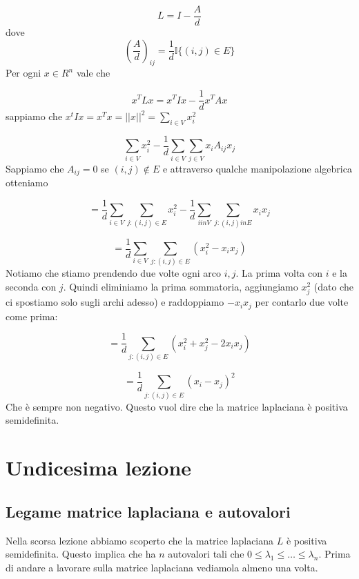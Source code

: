 \documentclass[12pt]{report}
\begin{document}
$$L= I - \frac{A}{d}$$
dove
$$(\frac{A}{d})_{ij} = \frac{1}{d} \mathds{I} \{(i,j) \in E\}$$
Per ogni $x \in R^n$ vale che

$$x^T L x = x^T I x - \frac{1}{d} x^T A x$$
sappiamo che $x^t I x = x^T x = ||x||^2 = \sum_{i \in V} x_i^2$

$$\sum_{i \in V} x_i^2 - \frac{1}{d} \sum_{i \in V}\sum_{j \in V} x_i A_{ij} x_j$$ 
Sappiamo che $A_{ij} = 0$ se $(i,j) \notin E$ e attraverso qualche manipolazione algebrica otteniamo

$$= \frac{1}{d} \sum_{i \in V}\sum_{j: (i,j) \in E} x_i^2 - \frac{1}{d} \sum_{i in V} \sum_{j: (i,j) in E} x_i x_j$$

$$= \frac{1}{d} \sum_{i \in V}\sum_{j: (i,j) \in E} (x_i^2 - x_i x_j)$$
Notiamo che stiamo prendendo due volte ogni arco $i,j$. La prima volta con $i$ e la seconda con $j$. Quindi eliminiamo la prima sommatoria, aggiungiamo $x_j^2$ (dato che ci spostiamo solo sugli archi adesso) e raddoppiamo $-x_ix_j$ per contarlo due volte come prima:

$$= \frac{1}{d} \sum_{j: (i,j) \in E} (x_i^2 + x_j^2 - 2x_i x_j)$$

$$= \frac{1}{d} \sum_{j: (i,j) \in E} (x_i - x_j)^2$$
Che è sempre non negativo.  Questo vuol dire che la matrice laplaciana è positiva semidefinita.


\chapter{Undicesima lezione}

\section{Legame matrice laplaciana e autovalori}

\noindent 
Nella scorsa lezione abbiamo scoperto che la matrice laplaciana $L$ è positiva semidefinita. Questo implica che ha $n$ autovalori tali che $0 \leq \lambda_1 \leq \dots \leq \lambda_n$. Prima di andare a lavorare sulla matrice laplaciana vediamola almeno una volta.
\end{document}
